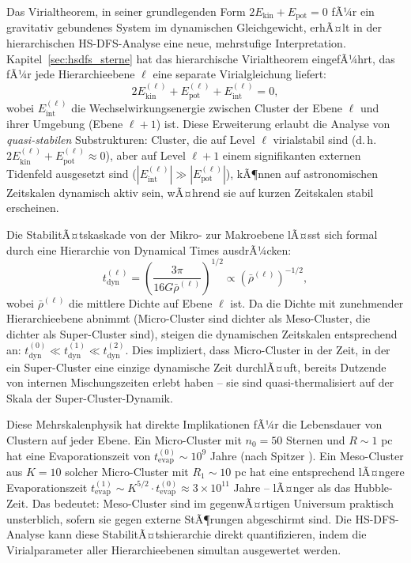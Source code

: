 ﻿\documentclass[a4paper,12pt]{report}
\theoremstyle{definition}
\begin{document}
Das Virialtheorem, in seiner grundlegenden Form $2E_\mathrm{kin} + E_\mathrm{pot} = 0$ fÃ¼r ein gravitativ gebundenes System im dynamischen Gleichgewicht, erhÃ¤lt in der hierarchischen HS-DFS-Analyse eine neue, mehrstufige Interpretation. Kapitel~\ref{sec:hsdfs_sterne} hat das hierarchische Virialtheorem eingefÃ¼hrt, das fÃ¼r jede Hierarchieebene $\ell$ eine separate Virialgleichung liefert:
\[
2E_\mathrm{kin}^{(\ell)} + E_\mathrm{pot}^{(\ell)} + E_\mathrm{int}^{(\ell)} = 0,
\]
wobei $E_\mathrm{int}^{(\ell)}$ die Wechselwirkungsenergie zwischen Cluster der Ebene $\ell$ und ihrer Umgebung (Ebene $\ell+1$) ist. Diese Erweiterung erlaubt die Analyse von \emph{quasi-stabilen} Substrukturen: Cluster, die auf Level $\ell$ virialstabil sind (d.\,h. $2E_\mathrm{kin}^{(\ell)} + E_\mathrm{pot}^{(\ell)} \approx 0$), aber auf Level $\ell+1$ einem signifikanten externen Tidenfeld ausgesetzt sind ($|E_\mathrm{int}^{(\ell)}| \gg |E_\mathrm{pot}^{(\ell)}|$), kÃ¶nnen auf astronomischen Zeitskalen dynamisch aktiv sein, wÃ¤hrend sie auf kurzen Zeitskalen stabil erscheinen.

Die StabilitÃ¤tskaskade von der Mikro- zur Makroebene lÃ¤sst sich formal durch eine Hierarchie von Dynamical Times ausdrÃ¼cken:
\[
t_\mathrm{dyn}^{(\ell)} = \left(\frac{3\pi}{16 G \bar{\rho}^{(\ell)}}\right)^{1/2} \propto \left(\bar{\rho}^{(\ell)}\right)^{-1/2},
\]
wobei $\bar{\rho}^{(\ell)}$ die mittlere Dichte auf Ebene $\ell$ ist. Da die Dichte mit zunehmender Hierarchieebene abnimmt (Micro-Cluster sind dichter als Meso-Cluster, die dichter als Super-Cluster sind), steigen die dynamischen Zeitskalen entsprechend an: $t_\mathrm{dyn}^{(0)} \ll t_\mathrm{dyn}^{(1)} \ll t_\mathrm{dyn}^{(2)}$. Dies impliziert, dass Micro-Cluster in der Zeit, in der ein Super-Cluster eine einzige dynamische Zeit durchlÃ¤uft, bereits Dutzende von internen Mischungszeiten erlebt haben -- sie sind quasi-thermalisiert auf der Skala der Super-Cluster-Dynamik.

Diese Mehrskalenphysik hat direkte Implikationen fÃ¼r die Lebensdauer von Clustern auf jeder Ebene. Ein Micro-Cluster mit $n_0 = 50$ Sternen und $R \sim 1$ pc hat eine Evaporationszeit von $t_\mathrm{evap}^{(0)} \sim 10^9$ Jahre (nach Spitzer \cite{spitzer1987}). Ein Meso-Cluster aus $K = 10$ solcher Micro-Cluster mit $R_1 \sim 10$ pc hat eine entsprechend lÃ¤ngere Evaporationszeit $t_\mathrm{evap}^{(1)} \sim K^{5/2} \cdot t_\mathrm{evap}^{(0)} \approx 3 \times 10^{11}$ Jahre -- lÃ¤nger als das Hubble-Zeit. Das bedeutet: Meso-Cluster sind im gegenwÃ¤rtigen Universum praktisch unsterblich, sofern sie gegen externe StÃ¶rungen abgeschirmt sind. Die HS-DFS-Analyse kann diese StabilitÃ¤tshierarchie direkt quantifizieren, indem die Virialparameter aller Hierarchieebenen simultan ausgewertet werden.
\end{document}
